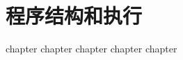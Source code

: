 
\part{程序结构和执行}
{
    {chapter}
    {chapter}
    {chapter}
    {chapter}
    {chapter}
}

\cleardoublepage

\endinput
